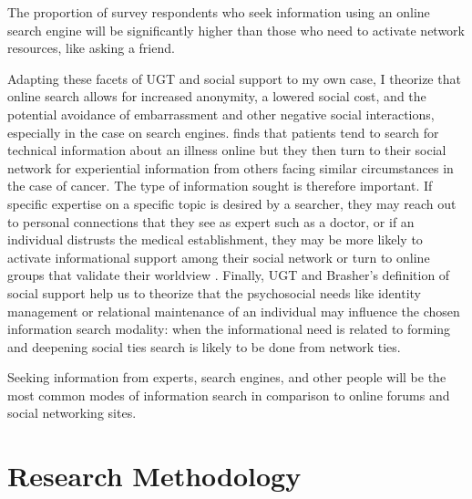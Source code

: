 \begin{hyp} \label{hyp:online-vs-network}
The proportion of survey respondents who seek information
using an online search engine will be significantly higher than those who
need to activate network resources, like asking a friend.
\end{hyp}


Adapting these facets of UGT and social support to my own case, I theorize that
online search allows for increased anonymity, a lowered social cost, and the
potential avoidance of embarrassment and other negative social interactions,
especially in the case on search engines.
\citet{rainsCopingIllnessDigitally2018} finds that patients tend to search for
technical information about an illness online but they then turn to their social
network for experiential information from others facing similar circumstances in
the case of cancer. The type of information sought is therefore important. If
specific expertise on a specific topic is desired by a searcher, they may reach
out to personal connections that they see as expert such as a doctor, or if an
individual distrusts the medical establishment, they may be more likely to
activate informational support among their social network or turn to online
groups that validate their worldview \citep{bogersHowSocialAre2014}. Finally,
UGT and Brasher's definition of social support
\citeyearpar{brashersInformationSeekingAvoiding2002} help us to theorize that
the psychosocial needs like identity management or relational maintenance of an
individual may influence the chosen information search modality: when the
informational need is related to forming and deepening social ties search is
likely to be done from network ties.

\begin{hyp} \label{hyp:drgooglefriend}
Seeking information from experts, search engines, and other people
will be the most common modes of information search in comparison
to online forums and social networking sites. 
\end{hyp}

\hypertarget{research-methodology}{\section{Research Methodology}\label{research-methodology}}

